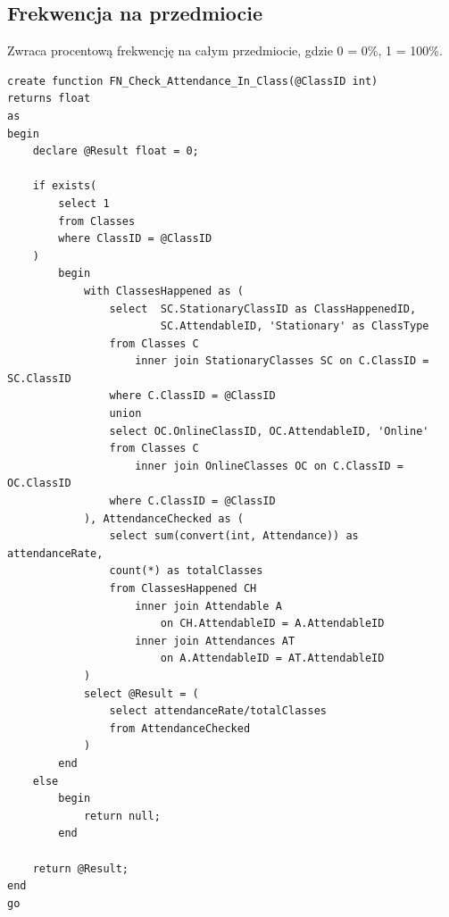 \documentclass[11pt,a4paper]{article}
\begin{document}
\subsection{Frekwencja na przedmiocie}
Zwraca procentową frekwencję na całym przedmiocie, gdzie 0 = 0\%, 1 = 100\%.
\begin{Verbatim}[breaklines=true]
create function FN_Check_Attendance_In_Class(@ClassID int)
returns float
as
begin
    declare @Result float = 0;

    if exists(
        select 1
        from Classes
        where ClassID = @ClassID
    )
        begin
            with ClassesHappened as (
                select  SC.StationaryClassID as ClassHappenedID, 
                        SC.AttendableID, 'Stationary' as ClassType
                from Classes C
                    inner join StationaryClasses SC on C.ClassID = SC.ClassID
                where C.ClassID = @ClassID
                union
                select OC.OnlineClassID, OC.AttendableID, 'Online'
                from Classes C
                    inner join OnlineClasses OC on C.ClassID = OC.ClassID
                where C.ClassID = @ClassID
            ), AttendanceChecked as (
                select sum(convert(int, Attendance)) as attendanceRate, 
                count(*) as totalClasses
                from ClassesHappened CH
                    inner join Attendable A 
                        on CH.AttendableID = A.AttendableID
                    inner join Attendances AT 
                        on A.AttendableID = AT.AttendableID
            )
            select @Result = (
                select attendanceRate/totalClasses
                from AttendanceChecked
            )
        end
    else
        begin
            return null;
        end

    return @Result;
end
go
\end{Verbatim}
\end{document}
